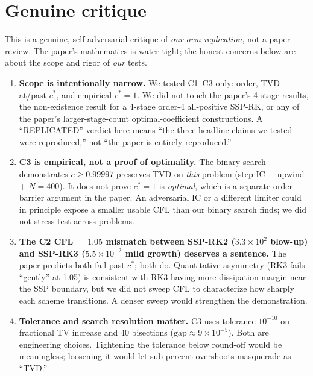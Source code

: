 \documentclass[11pt]{article}
\begin{document}
\section{Genuine critique}
\label{sec:critique}

This is a genuine, self-adversarial critique of \emph{our own replication},
not a paper review. The paper's mathematics is water-tight; the honest
concerns below are about the scope and rigor of \emph{our} tests.

\begin{enumerate}

\item \textbf{Scope is intentionally narrow.} We tested C1--C3 only: order,
TVD at/past $c^{\ast}$, and empirical $c^{\ast}=1$. We did not touch the
paper's 4-stage results, the non-existence result for a 4-stage
order-4 all-positive SSP-RK, or any of the paper's larger-stage-count
optimal-coefficient constructions. A ``REPLICATED'' verdict here means
``the three headline claims we tested were reproduced,'' not ``the paper
is entirely reproduced.''

\item \textbf{C3 is empirical, not a proof of optimality.} The binary
search demonstrates $c \ge 0.99997$ preserves TVD on \emph{this} problem
(step IC + upwind + $N=400$). It does not prove $c^{\ast} = 1$ is
\emph{optimal}, which is a separate order-barrier argument in the paper.
An adversarial IC or a different limiter could in principle expose a
smaller usable CFL than our binary search finds; we did not stress-test
across problems.

\item \textbf{The C2 CFL $= 1.05$ mismatch between SSP-RK2 ($3.3\!\times\!10^{2}$
blow-up) and SSP-RK3 ($5.5\!\times\!10^{-2}$ mild growth) deserves a
sentence.} The paper predicts both fail past $c^{\ast}$; both do.
Quantitative asymmetry (RK3 fails ``gently'' at 1.05) is consistent with
RK3 having more dissipation margin near the SSP boundary, but we did not
sweep CFL to characterize how sharply each scheme transitions. A denser
sweep would strengthen the demonstration.

\item \textbf{Tolerance and search resolution matter.} C3 uses tolerance
$10^{-10}$ on fractional TV increase and 40 bisections
($\text{gap} \approx 9\!\times\!10^{-5}$). Both are engineering choices.
Tightening the tolerance below round-off would be meaningless; loosening
it would let sub-percent overshoots masquerade as ``TVD.''


\end{enumerate}
\end{document}
